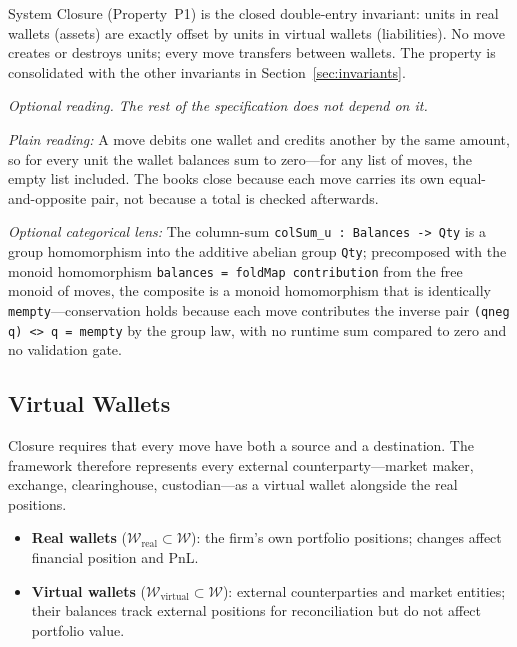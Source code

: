 System Closure (Property~P1) is the closed double-entry invariant: units in real wallets (assets) are exactly offset by units in virtual wallets (liabilities). No move creates or destroys units; every move transfers between wallets. The property is consolidated with the other invariants in Section~\ref{sec:invariants}.

\begin{remark}
\emph{Optional reading. The rest of the specification does not depend on it.}

\noindent\emph{Plain reading:} A move debits one wallet and credits another by the same amount, so for every unit the wallet balances sum to zero---for any list of moves, the empty list included. The books close because each move carries its own equal-and-opposite pair, not because a total is checked afterwards.

\noindent\emph{Optional categorical lens:} The column-sum \texttt{colSum\_u : Balances -> Qty} is a group homomorphism into the additive abelian group \texttt{Qty}; precomposed with the monoid homomorphism \texttt{balances = foldMap contribution} from the free monoid of moves, the composite is a monoid homomorphism that is identically \texttt{mempty}---conservation holds because each move contributes the inverse pair \texttt{(qneg q) <> q = mempty} by the group law, with no runtime sum compared to zero and no validation gate.
\end{remark}



\subsection{Virtual Wallets}

Closure requires that every move have both a source and a destination. The framework therefore represents every external counterparty---market maker, exchange, clearinghouse, custodian---as a virtual wallet alongside the real positions.

\begin{definition}\hfill
\begin{itemize}[nosep]
\item \textbf{Real wallets} ($\mathcal{W}_{\mathrm{real}} \subset \mathcal{W}$): the firm's own portfolio positions; changes affect financial position and PnL.
\item \textbf{Virtual wallets} ($\mathcal{W}_{\mathrm{virtual}} \subset \mathcal{W}$): external counterparties and market entities; their balances track external positions for reconciliation but do not affect portfolio value.
\end{itemize}
\end{definition}

